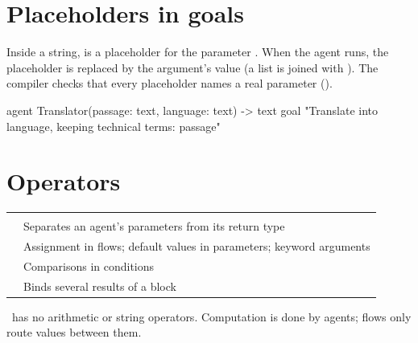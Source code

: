 \section{Placeholders in goals}

Inside a  string,  is a placeholder for the parameter . When the agent runs, the placeholder is replaced by the argument's value (a list is joined with ). The compiler checks that every placeholder names a real parameter ().

\begin{algo}
agent Translator(passage: text, language: text) -> text {
    goal "Translate into {language}, keeping technical terms: {passage}"
}
\end{algo}

\section{Operators}

\begin{center}
\small
\begin{tabularx}{\linewidth}{@{}L{3.3cm}Y@{}}
\toprule
{} & \\
\goldrule
\code{->} & Separates an agent's parameters from its return type\\
\code{=} & Assignment in flows; default values in parameters; keyword arguments\\
\code{<} \code{<=} \code{>} \code{>=} \code{==} \code{!=} & Comparisons in  conditions\\
\code{[ , ]} & Binds several results of a  block\\
\bottomrule
\end{tabularx}
\end{center}

\algolang\ has no arithmetic or string operators. Computation is done by agents; flows only route values between them.
